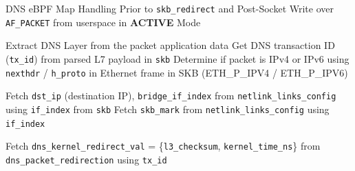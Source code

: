 \documentclass [11pt, proquest] {uwthesis}[2020/02/24]
\begin{document}
\begin{algorithm}[H]
\caption{DNS eBPF Map Handling Prior to \texttt{skb\_redirect} and Post-Socket Write over \texttt{AF\_PACKET} from userspace in \textbf{ACTIVE} Mode}
\label{sec:alg2}

\small %


Extract DNS Layer from the packet application data\;
Get DNS transaction ID (\texttt{tx\_id}) from parsed L7 payload in \texttt{skb}\;
Determine if packet is IPv4 or IPv6 using \texttt{nexthdr} / \texttt{h\_proto} in Ethernet frame in SKB (ETH\_P\_IPV4 / ETH\_P\_IPV6)\;

Fetch \texttt{dst\_ip} (destination IP), \texttt{bridge\_if\_index} from \texttt{netlink\_links\_config} using \texttt{if\_index} from \texttt{skb}\;
Fetch \texttt{skb\_mark} from \texttt{netlink\_links\_config} using \texttt{if\_index}\;

Fetch \texttt{dns\_kernel\_redirect\_val} = \{\texttt{l3\_checksum}, \texttt{kernel\_time\_ns}\} from \texttt{dns\_packet\_redirection} using \texttt{tx\_id}\;

\end{algorithm}
\end{document}
